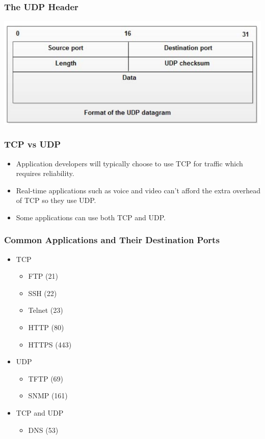 \documentclass[pdflatex,compress]{beamer}
\begin{document}
\begin{frame}
	\frametitle{The UDP Header}
	\begin{center}
		\includegraphics[width=\linewidth]{img/img13}
	\end{center}
\end{frame}

\begin{frame}
	\frametitle{TCP vs UDP}
	\begin{itemize}
		\item Application developers will typically choose to use TCP for traffic which requires reliability.
		\item Real-time applications such as voice and video can't afford the extra overhead of TCP so they use UDP.
		\item Some applications can use both TCP and UDP.
	\end{itemize}
\end{frame}

\begin{frame}
	\frametitle{Common Applications and Their Destination Ports}
	\begin{itemize}
		\item TCP
		\begin{itemize}
			\item FTP (21)
			\item SSH (22)
			\item Telnet (23)
			\item HTTP (80)
			\item HTTPS (443)
		\end{itemize}
		\item UDP
		\begin{itemize}
			\item TFTP (69)
			\item SNMP (161)
		\end{itemize}
		\item TCP and UDP
		\begin{itemize}
			\item DNS (53)
		\end{itemize}
	\end{itemize}
\end{frame}
\end{document}
